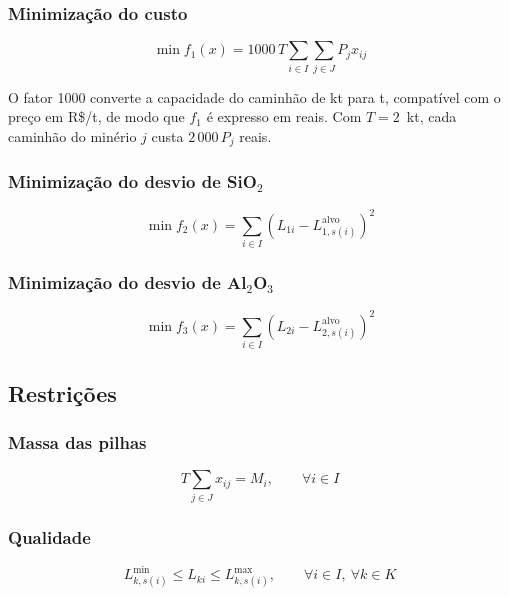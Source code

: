\documentclass[conference]{IEEEtran}
\begin{document}
\subsubsection{Minimização do custo}

\begin{equation}
\min f_1(x)
=
1000\,T
\sum_{i\in I}
\sum_{j\in J}
P_j x_{ij}
\end{equation}

O fator 1000 converte a capacidade do caminhão de kt para t, compatível com o preço em R\$/t, de modo que $f_1$ é expresso em reais. Com $T = 2$~kt, cada caminhão do minério $j$ custa $2\,000\,P_j$ reais.

\subsubsection{Minimização do desvio de SiO$_2$}

\begin{equation}
\min f_2(x)
=
\sum_{i\in I}
\left(
L_{1i}
-
L_{1,s(i)}^{\mathrm{alvo}}
\right)^2
\end{equation}

\subsubsection{Minimização do desvio de Al$_2$O$_3$}

\begin{equation}
\min f_3(x)
=
\sum_{i\in I}
\left(
L_{2i}
-
L_{2,s(i)}^{\mathrm{alvo}}
\right)^2
\end{equation}

\subsection{Restrições}

\subsubsection{Massa das pilhas}

\begin{equation}
T
\sum_{j\in J}
x_{ij}
=
M_i,
\qquad \forall i\in I
\end{equation}

\subsubsection{Qualidade}

\begin{equation}
L_{k,s(i)}^{\min}
\leq
L_{ki}
\leq
L_{k,s(i)}^{\max},
\qquad
\forall i\in I,\ \forall k\in K
\end{equation}
\end{document}

